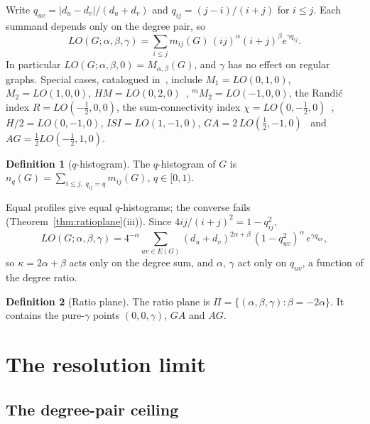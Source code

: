 \documentclass[a5paper, 10pt]{article}
\theoremstyle{plain}
\theoremstyle{remark}
\theoremstyle{definition}
\newtheorem{definition}{Definition}
\begin{document}
Write $q_{uv} = |d_u - d_v|/(d_u + d_v)$ and $q_{ij} = (j-i)/(i+j)$ for
$i \le j$. Each summand depends only on the degree pair, so
\begin{equation}\label{eq:pairsum}
LO(G;\alpha,\beta,\gamma) = \sum_{i \le j} m_{ij}(G)\,
(ij)^{\alpha}(i+j)^{\beta} e^{\gamma q_{ij}} .
\end{equation}
In particular $LO(G;\alpha,\beta,0) = M_{\alpha,\beta}(G)$, and $\gamma$
has no effect on regular graphs. Special cases, catalogued
in~\cite{MolinaSigarreta2025GM}, include $M_1 = LO(0,1,0)$,
$M_2 = LO(1,0,0)$, $HM = LO(0,2,0)$~\cite{ShirdelRezapourSayadi2013HM},
${}^{m}\!M_2 = LO(-1,0,0)$, the Randi\'c index $R = LO(-\tfrac12,0,0)$,
the sum-connectivity index
$\chi = LO(0,-\tfrac12,0)$~\cite{ZhouTrinajstic2009sumconn},
$H/2 = LO(0,-1,0)$, $ISI = LO(1,-1,0)$,
$GA = 2\,LO(\tfrac12,-1,0)$~\cite{VukicevicFurtula2009GA} and
$AG = \tfrac12 LO(-\tfrac12,1,0)$.

\begin{definition}[$q$-histogram]\label{def:qhist}
The $q$-histogram of $G$ is
$n_q(G) = \sum_{i \le j,\; q_{ij} = q} m_{ij}(G)$, $q \in [0,1)$.
\end{definition}

Equal profiles give equal $q$-histograms; the converse fails
(Theorem~\ref{thm:ratioplane}(iii)). Since $4ij/(i+j)^2 = 1 - q_{ij}^2$,
\begin{equation}\label{eq:factor}
LO(G;\alpha,\beta,\gamma) = 4^{-\alpha} \sum_{uv \in E(G)}
(d_u + d_v)^{2\alpha+\beta}\,(1 - q_{uv}^2)^{\alpha}\, e^{\gamma q_{uv}},
\end{equation}
so $\kappa = 2\alpha + \beta$ acts only on the degree sum, and $\alpha$,
$\gamma$ act only on $q_{uv}$, a function of the degree ratio.

\begin{definition}[Ratio plane]\label{def:ratioplane}
The ratio plane is
$\Pi = \{(\alpha,\beta,\gamma) : \beta = -2\alpha\}$. It contains the
pure-$\gamma$ points $(0,0,\gamma)$, $GA$ and $AG$.
\end{definition}

\section{The resolution limit}\label{sec:limit}

\subsection{The degree-pair ceiling}\label{sec:ceiling}
\end{document}
